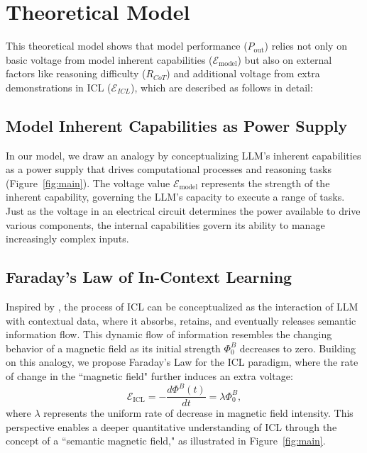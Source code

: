 \section{Theoretical Model}
This theoretical model shows that model performance (\( P_{\text{out}} \)) relies not only on basic voltage from model inherent capabilities ($\mathcal{E}_{\text{model}}$) but also on external factors like reasoning difficulty ($R_{CoT}$) and additional voltage from extra demonstrations in ICL ($\mathcal{E}_{ICL}$), which are described as follows in detail:

\subsection{Model Inherent Capabilities as Power Supply}
In our model, we draw an analogy by conceptualizing LLM's inherent capabilities as a power supply that drives computational processes and reasoning tasks (Figure~\ref{fig:main}). The voltage value \( \mathcal{E}_{\text{model}} \) represents the strength of the inherent capability, governing the LLM's capacity to execute a range of tasks. Just as the voltage in an electrical circuit determines the power available to drive various components, the  internal capabilities govern its ability to manage increasingly complex inputs.

\subsection{Faraday's Law of In-Context Learning}

Inspired by \citet{wang-etal-2023-label}, the process of ICL can be conceptualized as the interaction of LLM with contextual data, where it absorbs, retains, and eventually releases semantic information flow. This dynamic flow of information resembles the changing behavior of a magnetic field as its initial strength $\Phi^B_0$ decreases to zero.
Building on this analogy, we propose Faraday's Law for the ICL paradigm, where the rate of change in the ``magnetic field" further induces an extra voltage:
\begin{equation}
    \mathcal{E}_{\text{ICL}} = -\frac{d\Phi^B(t)}{dt} = \lambda\Phi_0^B,
\end{equation}
where $\lambda$ represents the uniform rate of decrease in magnetic field intensity. This perspective enables a deeper quantitative understanding of ICL through the concept of a ``semantic magnetic field," as illustrated in Figure~\ref{fig:main}.


